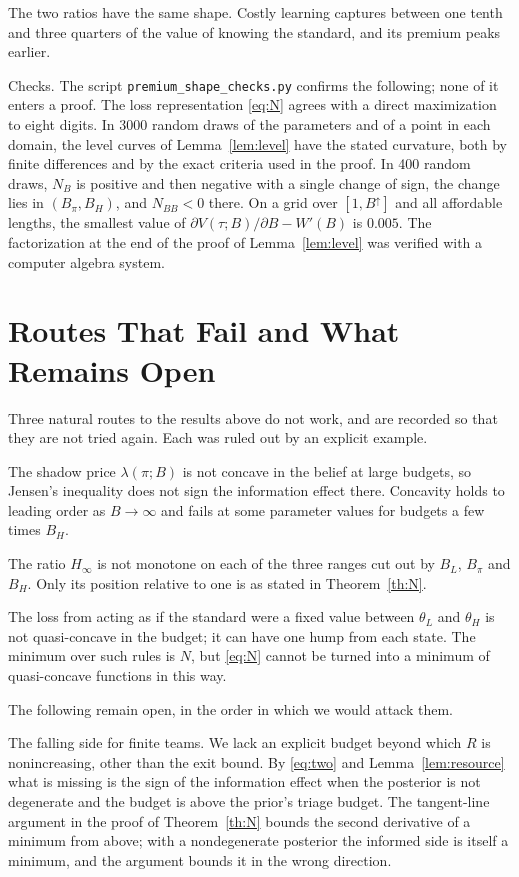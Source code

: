 \documentclass[11pt]{article}
\theoremstyle{definition}
\begin{document}
The two ratios have the same shape. Costly learning captures between one tenth and three quarters of the value of knowing the standard, and its premium peaks earlier.

Checks. The script \texttt{premium\_shape\_checks.py} confirms the following; none of it enters a proof. The loss representation \eqref{eq:N} agrees with a direct maximization to eight digits. In 3000 random draws of the parameters and of a point in each domain, the level curves of Lemma~\ref{lem:level} have the stated curvature, both by finite differences and by the exact criteria used in the proof. In 400 random draws, $N_B$ is positive and then negative with a single change of sign, the change lies in $(B_\pi,B_H)$, and $N_{BB}<0$ there. On a grid over $[1,B^{\uparrow}]$ and all affordable lengths, the smallest value of $\partial V(\tau;B)/\partial B-W'(B)$ is $0.005$. The factorization at the end of the proof of Lemma~\ref{lem:level} was verified with a computer algebra system.

\section{Routes That Fail and What Remains Open}

Three natural routes to the results above do not work, and are recorded so that they are not tried again. Each was ruled out by an explicit example.

The shadow price $\lambda(\pi;B)$ is not concave in the belief at large budgets, so Jensen's inequality does not sign the information effect there. Concavity holds to leading order as $B\to\infty$ and fails at some parameter values for budgets a few times $B_H$.

The ratio $H_\infty$ is not monotone on each of the three ranges cut out by $B_L$, $B_\pi$ and $B_H$. Only its position relative to one is as stated in Theorem~\ref{th:N}.

The loss from acting as if the standard were a fixed value between $\theta_L$ and $\theta_H$ is not quasi-concave in the budget; it can have one hump from each state. The minimum over such rules is $N$, but \eqref{eq:N} cannot be turned into a minimum of quasi-concave functions in this way.

The following remain open, in the order in which we would attack them.

The falling side for finite teams. We lack an explicit budget beyond which $R$ is nonincreasing, other than the exit bound. By \eqref{eq:two} and Lemma~\ref{lem:resource} what is missing is the sign of the information effect when the posterior is not degenerate and the budget is above the prior's triage budget. The tangent-line argument in the proof of Theorem~\ref{th:N} bounds the second derivative of a minimum from above; with a nondegenerate posterior the informed side is itself a minimum, and the argument bounds it in the wrong direction.
\end{document}
